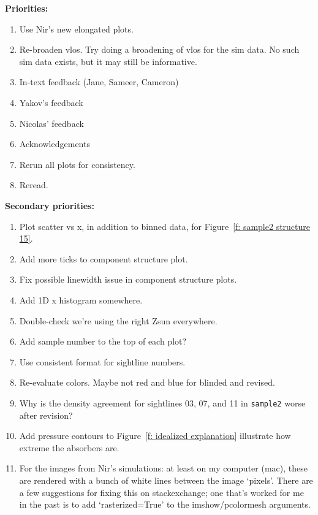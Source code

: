 \documentclass[fleqn,usenatbib]{mnras}
\begin{document}
\textbf{Priorities:}
\begin{enumerate}
    \item Use Nir's new elongated plots.
    \item Re-broaden vlos. Try doing a broadening of vlos for the sim data. No such sim data exists, but it may still be informative.
    \item In-text feedback (Jane, Sameer, Cameron)
    \item Yakov's feedback
    \item Nicolas' feedback
    \item Acknowledgements
    \item Rerun all plots for consistency.
    \item Reread.
\end{enumerate}

\textbf{Secondary priorities:}
\begin{enumerate}
    \item Plot scatter vs x, in addition to binned data, for Figure~\ref{f: sample2 structure 15}.
    \item Add more ticks to component structure plot.
    \item Fix possible linewidth issue in component structure plots.
    \item Add 1D x histogram somewhere.
    \item Double-check we're using the right Zsun everywhere.
    \item Add sample number to the top of each plot?
    \item Use consistent format for sightline numbers.
    \item Re-evaluate colors. Maybe not red and blue for blinded and revised.
    \item Why is the density agreement for sightlines 03, 07, and 11 in \texttt{sample2} worse after revision?
    \item Add pressure contours to Figure~\ref{f: idealized explanation} illustrate how extreme the absorbers are.
    \item For the images from Nir's simulations: at least on my computer (mac), these are rendered with a bunch of white lines between the image `pixels'. There are a few suggestions for fixing this on stackexchange; one that's worked for me in the past is to add `rasterized=True' to the imshow/pcolormesh arguments. 
\end{enumerate}
\end{document}
